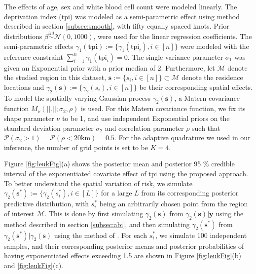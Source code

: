 \documentclass[ba]{imsart}
\begin{document}
The effects of age, sex and white blood cell count were modeled linearly. The deprivation index (tpi) was modeled as a semi-parametric effect using method described in section \ref{subsec:smooth}, with fifty equally spaced knots. Prior distributions $\beta \stackrel{iid}{\sim} \mathcal{N}(0, 1000)$, were used for the linear regression coefficients. The semi-parametric effects $\gamma_1(\textbf{tpi}) := \{\gamma_1(\text{tpi}_i), i\in [n]\}$ were modeled with the reference constraint $\sum_{i=1}^{n}\gamma_1(\text{tpi}_i) = 0$. The single variance parameter $\sigma_1$ was given an $\text{Exponential}$ prior with a prior median of 2. Furthermore, let $\mathcal{M}$ denote the studied region in this dataset, $\boldsymbol{s} := \{s_i, i \in [n]\} \subset \mathcal{M}$ denote the residence locations and $\gamma_2(\boldsymbol{s}) := \{\gamma_2(s_i), i \in [n]\}$ be their corresponding spatial effects. To model the spatially varying Gaussian process $\gamma_2(\boldsymbol{s})$, a Matern covariance function $M_\nu(||.||;\sigma_2,\rho)$ is used. For this Matern covariance function, we fix its shape parameter $\nu$ to be 1, and use independent Exponential priors on the standard deviation parameter $\sigma_2$ and correlation parameter $\rho$ such that $\mathcal{P}(\sigma_2 > 1) = \mathcal{P}(\rho < 20 \text{km}) = 0.5$.
For the adaptive quadrature we used in our inference, the number of grid points is set to be $K = 4$. 

Figure \ref{fig:leukFig}(a) shows the posterior mean and posterior 95 \% credible interval of the exponentiated covariate effect of tpi using the proposed approach. To better understand the spatial variation of risk, we simulate $\gamma_2(\boldsymbol{s^*}):= \{\gamma_2(s_i^*), i\in [L]\}$ for a large $L$ from its corresponding posterior predictive distribution, with $s_i^*$ being an arbitrarily chosen point from the region of interest $\mathcal{M}$. This is done by first simulating $\gamma_2(\boldsymbol{s})$ from $\gamma_2(\boldsymbol{s})|\boldsymbol{y}$ using the method described in section \ref{subsec:abi}, and then simulating $\gamma_2(\boldsymbol{s}^*)$ from $\gamma_2(\boldsymbol{s}^*)|\gamma_2(\boldsymbol{s})$ using the method of \cite{schlather2015analysis}. For each $s_i^*$, we simulate 100 independent samples, and their corresponding posterior means and posterior probabilities of having exponentiated effects exceeding 1.5 are shown in Figure \ref{fig:leukFig}(b) and \ref{fig:leukFig}(c).
\end{document}
